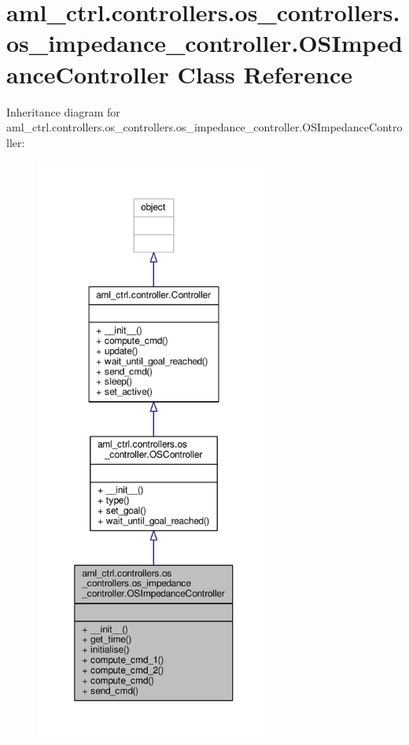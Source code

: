 \hypertarget{classaml__ctrl_1_1controllers_1_1os__controllers_1_1os__impedance__controller_1_1_o_s_impedance_controller}{\section{aml\-\_\-ctrl.\-controllers.\-os\-\_\-controllers.\-os\-\_\-impedance\-\_\-controller.\-O\-S\-Impedance\-Controller Class Reference}
\label{classaml__ctrl_1_1controllers_1_1os__controllers_1_1os__impedance__controller_1_1_o_s_impedance_controller}
}


Inheritance diagram for aml\-\_\-ctrl.\-controllers.\-os\-\_\-controllers.\-os\-\_\-impedance\-\_\-controller.\-O\-S\-Impedance\-Controller\-:\nopagebreak
\begin{figure}[H]
\begin{center}
\leavevmode
\includegraphics[height=550pt]{classaml__ctrl_1_1controllers_1_1os__controllers_1_1os__impedance__controller_1_1_o_s_impedance_controller__inherit__graph}
\end{center}
\end{figure}


